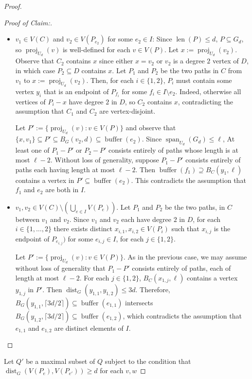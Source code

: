 \documentclass{patmorin}
\newenvironment{clmproof}{\begin{proof}[Proof of Claim:]\renewcommand{\qedsymbol}{\rule{1ex}{1ex}}}{\end{proof}}
\DeclareMathOperator{\len}{len}
\DeclareMathOperator{\buffer}{buffer}
\DeclareMathOperator{\proj}{proj}
\DeclareMathOperator{\spn}{span}
\DeclareMathOperator{\dist}{dist}
\begin{document}
\begin{proof}
\begin{clmproof}
\begin{itemize}
      \item $v_1\in V(C)$ and $v_2\in V(P_{e_2})$ for some $e_2\in I$:
      Since $\len(P)\le d$, $P\subseteq G_d$, so $\proj_{U_d}(v)$ is well-defined for each $v\in V(P)$.  Let $x:=\proj_{U_d}(v_2)$.  Observe that $C_2$ contains $x$ since either $x=v_2$ or $v_2$ is a degree $2$ vertex of $D$, in which case $P_2\subseteq D$ contains $x$.  Let $P_1$ and $P_2$ be the two paths in $C$ from $v_1$ to $x:=\proj_{U_d}(v_2)$.
      Then, for each $i\in\{1,2\}$, $P_i$ must contain some vertex $y_i$ that is an endpoint of $P_{f_i}$ for some $f_i\in I\setminus e_2$. Indeed, otherwise all vertices of $P_i-x$ have degree $2$ in $D$, so $C_2$ contains $x$, contradicting the assumption that $C_1$ and $C_2$ are vertex-disjoint.

      Let $P':=\{\proj_{U_d}(v):v\in V(P)\}$ and observe that $\{x,v_1\}\subseteq P'\subseteq B_G(v_2,d)\subseteq\buffer(e_2)$.
      Since $\spn_{U_d}(G_d)\le\ell$, At least one of $P_1-P'$ or $P_2-P'$ consists entirely of paths whose length is at most $\ell-2$. Without loss of generality, suppose $P_1-P'$ consists entirely of paths each having length at most $\ell-2$.  Then $\buffer(f_1)\supseteq B_C(y_1,\ell)$ contains a vertex in $P'\subseteq\buffer(e_2)$.  This contradicts the assumption that $f_1$ and $e_2$ are both in $I$.

      \item $v_1,v_2\in V(C)\setminus(\bigcup_{e\in I}V(P_e))$. Let $P_1$ and $P_2$ be the two paths, in $C$ between $v_1$ and $v_2$.  Since $v_1$ and $v_2$ each have degree $2$ in $D$, for each $i\in\{1,\ldots,2\}$ there exists distinct $x_{i,1},x_{i,2}\in V(P_i)$ such that $x_{i,j}$ is the endpoint of $P_{e_{i,j}})$ for some $e_{i,j}\in I$, for each $j\in\{1,2\}$.

      Let $P':=\{\proj_{U_d}(v):v\in V(P)\}$.  As in the previous case, we may assume without loss of generality that $P_1-P'$ consists entirely of paths, each of length at most $\ell-2$.  For each $j\in\{1,2\}$, $B_C(x_{1,j},\ell)$ contains a vertex $y_{1,j}$ in $P'$.  Then $\dist_G(y_{1,1},y_{1,2})\le 3d$. Therefore, $B_G(y_{1,1},\lceil 3d/2\rceil)\subseteq \buffer(e_{1,1})$ intersects $B_G(y_{1,2},\lceil 3d/2\rceil)\subseteq\buffer(e_{1,2})$, which contradicts the assumption that $e_{1,1}$ and $e_{1,2}$ are distinct elements of $I$.
    \end{itemize}
  \end{clmproof}


  Let $Q'$ be a maximal subset of $Q$ subject to the condition that $\dist_G(V(P_e),V(P_{e'}))\ge d$ for each $v,w$

\end{proof}
\end{document}
